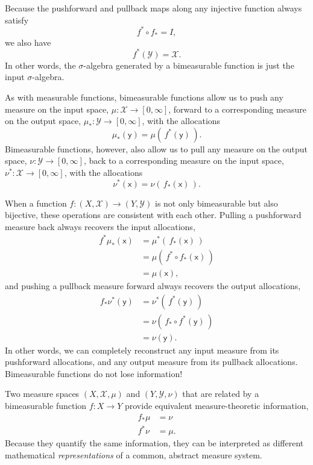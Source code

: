 \documentclass[
  letterpaper,
  DIV=11,
  numbers=noendperiod]{scrartcl}
\begin{document}
Because the pushforward and pullback maps along any injective function
always satisfy \[
f^{*} \circ f_{*} = I,
\] we also have \[
f^{*}(\mathcal{Y}) = \mathcal{X}.
\] In other words, the \(\sigma\)-algebra generated by a bimeasurable
function is just the input \(\sigma\)-algebra.

As with measurable functions, bimeasurable functions allow us to push
any measure on the input space,
\(\mu : \mathcal{X} \rightarrow [0, \infty]\), forward to a
corresponding measure on the output space,
\(\mu_{*} : \mathcal{Y} \rightarrow [0, \infty]\), with the allocations
\[
\mu_{*}(\mathsf{y}) = \mu( \, f^{*}(\mathsf{y}) \, ).
\] Bimeasurable functions, however, also allow us to pull any measure on
the output space, \(\nu : \mathcal{Y} \rightarrow [0, \infty]\), back to
a corresponding measure on the input space,
\(\nu^{*} : \mathcal{X} \rightarrow [0, \infty]\), with the allocations
\[
\nu^{*}(\mathsf{x}) = \nu( \, f_{*}(\mathsf{x}) \, ).
\]

When a function \(f : (X, \mathcal{X}) \rightarrow (Y, \mathcal{Y})\) is
not only bimeasurable but also bijective, these operations are
consistent with each other. Pulling a pushforward measure back always
recovers the input allocations, \begin{align*}
f^{*} \mu_{*} (\mathsf{x})
&=
\mu^{*}( \, f_{*}(\mathsf{x}) \, )
\\
&=
\mu( \, f^{*} \circ f_{*}(\mathsf{x}) \, )
\\
&=
\mu( \mathsf{x} ),
\end{align*} and pushing a pullback measure forward always recovers the
output allocations, \begin{align*}
f_{*} \nu^{*} (\mathsf{y})
&=
\nu^{*}( \, f^{*}(\mathsf{y}) \, )
\\
&=
\nu( \, f_{*} \circ f^{*}(\mathsf{y}) \, )
\\
&=
\nu( \mathsf{y} ).
\end{align*} In other words, we can completely reconstruct any input
measure from its pushforward allocations, and any output measure from
its pullback allocations. Bimeasurable functions do not lose
information!

Two measure spaces \((X, \mathcal{X}, \mu)\) and
\((Y, \mathcal{Y}, \nu)\) that are related by a bimeasurable function
\(f : X \rightarrow Y\) provide equivalent measure-theoretic
information, \begin{align*}
f_{*} \mu &= \nu
\\
f^{*} \nu &= \mu.
\end{align*} Because they quantify the same information, they can be
interpreted as different mathematical \emph{representations} of a
common, abstract measure system.
\end{document}
